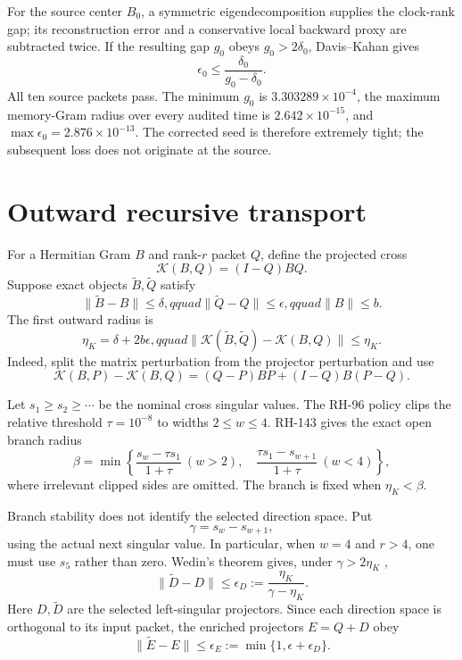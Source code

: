 \documentclass[12pt]{article}
\newcommand{\K}{\mathcal K}
\begin{document}
For the source center $B_0$, a symmetric eigendecomposition supplies the
clock-rank gap; its reconstruction error and a conservative local backward
proxy are subtracted twice.  If the resulting gap $g_0$ obeys
$g_0>2\delta_0$, Davis--Kahan gives \citep{DavisKahan1970,Bhatia2007}
\[
 \epsilon_0\leq\frac{\delta_0}{g_0-\delta_0}.
\]
All ten source packets pass.  The minimum $g_0$ is
$3.303289\times10^{-4}$, the maximum memory-Gram radius over every audited
time is $2.642\times10^{-15}$, and
$\max\epsilon_0=2.876\times10^{-13}$.  The corrected seed is therefore
extremely tight; the subsequent loss does not originate at the source.

\section{Outward recursive transport}
For a Hermitian Gram $B$ and rank-$r$ packet $Q$, define the projected cross
\[
 \K(B,Q)=(I-Q)BQ.
\]
Suppose exact objects $\widetilde B,\widetilde Q$ satisfy
\[
 \|\widetilde B-B\|\leq\delta,qquad
 \|\widetilde Q-Q\|\leq\epsilon,qquad \|B\|\leq b.
\]
The first outward radius is
\begin{equation}\label{eq:cross}
 \eta_K=\delta+2b\epsilon,qquad
 \|\K(\widetilde B,\widetilde Q)-\K(B,Q)\|\leq\eta_K.
\end{equation}
Indeed, split the matrix perturbation from the projector perturbation and
use
\[
 \K(B,P)-\K(B,Q)=(Q-P)BP+(I-Q)B(P-Q).
\]

Let $s_1\geq s_2\geq\cdots$ be the nominal cross singular values.  The RH-96
policy clips the relative threshold $\tau=10^{-8}$ to widths
$2\leq w\leq4$.  RH-143 gives the exact open branch radius
\[
 \beta=\min\left\{
 \frac{s_w-\tau s_1}{1+\tau}\ (w>2),\quad
 \frac{\tau s_1-s_{w+1}}{1+\tau}\ (w<4)
 \right\},
\]
where irrelevant clipped sides are omitted.  The branch is fixed when
$\eta_K<\beta$.

Branch stability does not identify the selected direction space.  Put
\[
 \gamma=s_w-s_{w+1},
\]
using the actual next singular value.  In particular, when $w=4$ and
$r>4$, one must use $s_5$ rather than zero.  Wedin's theorem gives, under
$\gamma>2\eta_K$ \citep{Wedin1972,StewartSun1990},
\begin{equation}\label{eq:direction}
 \|\widetilde D-D\|\leq
 \epsilon_D:=\frac{\eta_K}{\gamma-\eta_K}.
\end{equation}
Here $D,\widetilde D$ are the selected left-singular projectors.  Since each
direction space is orthogonal to its input packet, the enriched projectors
$E=Q+D$ obey
\[
 \|\widetilde E-E\|\leq
 \epsilon_E:=\min\{1,\epsilon+\epsilon_D\}.
\]
\end{document}
